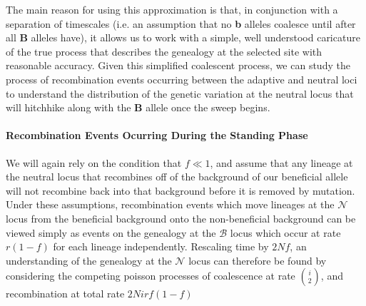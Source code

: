 \documentclass[a4paper,10pt]{article}
\newcommand{\fancyN}{$\mathcal N$ }
\newcommand{\fancyB}{$\mathcal B$ }
\begin{document}
The main reason for using this approximation is that, in conjunction with a separation of timescales (i.e. an assumption that no \textbf{b} alleles coalesce until after all \textbf{B} alleles have), it allows us to work with a simple, well understood caricature of the true process that describes the genealogy at the selected site with reasonable accuracy. Given this simplified coalescent process, we can study the process of recombination events occurring between the adaptive and neutral loci to understand the distribution of the genetic variation at the neutral locus that will hitchhike along with the \textbf{B} allele once the sweep begins. 

\paragraph{Recombination Events Ocurring During the Standing Phase}
We will again rely on the condition that $f \ll 1$, and assume that any lineage at the neutral locus that recombines off of the background of our beneficial allele will not recombine back into that background before it is removed by mutation. Under these assumptions, recombination events which move lineages at the \fancyN locus from the beneficial background onto the non-beneficial background can be viewed simply as events on the genealogy at the \fancyB locus which occur at rate $r\left(1-f\right)$ for each lineage independently. Rescaling time by $2Nf$, an understanding of the genealogy at the \fancyN locus can therefore be found by considering the competing poisson processes of coalescence at rate ${i \choose 2}$, and recombination at total rate $2Nirf(1-f)$


\end{document}
